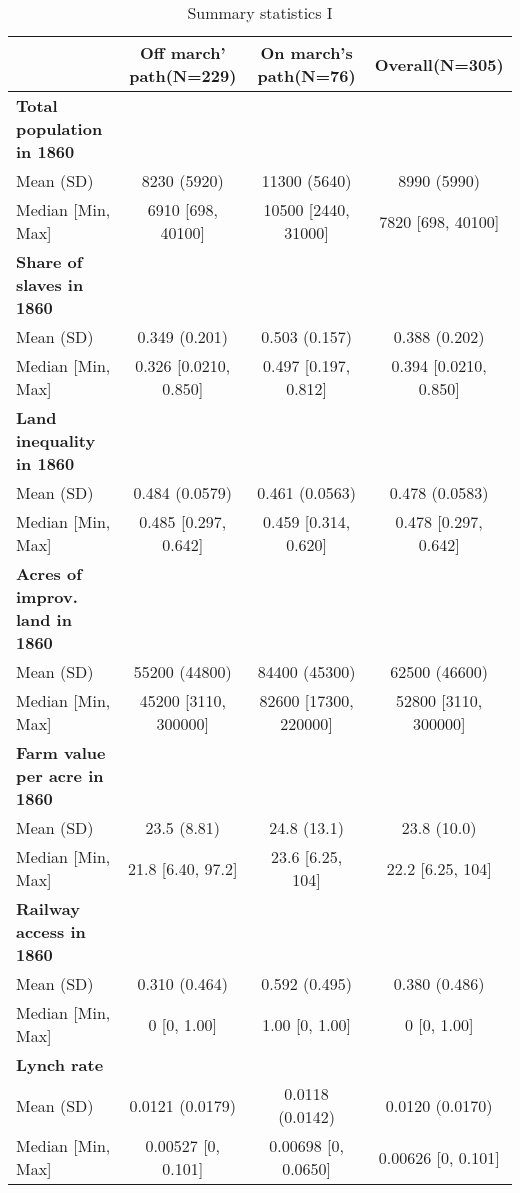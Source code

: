 \begin{table}[h]

\caption{\label{tab:desc_stat}Summary statistics I}
\centering
\fontsize{8}{10}\selectfont
\begin{tabular}[t]{>{}lccc}
\toprule
 & Off march' path(N=229) & On march's path(N=76) & Overall(N=305)\\
\midrule
\textbf{Total population in 1860} &  &  & \\
Mean (SD) & 8230 (5920) & 11300 (5640) & 8990 (5990)\\
Median [Min, Max] & 6910 [698, 40100] & 10500 [2440, 31000] & 7820 [698, 40100]\\
\addlinespace
\textbf{Share of slaves in 1860} &  &  & \\
Mean (SD) & 0.349 (0.201) & 0.503 (0.157) & 0.388 (0.202)\\
Median [Min, Max] & 0.326 [0.0210, 0.850] & 0.497 [0.197, 0.812] & 0.394 [0.0210, 0.850]\\
\addlinespace
\textbf{Land inequality in 1860} &  &  & \\
Mean (SD) & 0.484 (0.0579) & 0.461 (0.0563) & 0.478 (0.0583)\\
Median [Min, Max] & 0.485 [0.297, 0.642] & 0.459 [0.314, 0.620] & 0.478 [0.297, 0.642]\\
\addlinespace
\textbf{Acres of improv. land in 1860} &  &  & \\
Mean (SD) & 55200 (44800) & 84400 (45300) & 62500 (46600)\\
Median [Min, Max] & 45200 [3110, 300000] & 82600 [17300, 220000] & 52800 [3110, 300000]\\
\addlinespace
\textbf{Farm value per acre in 1860} &  &  & \\
Mean (SD) & 23.5 (8.81) & 24.8 (13.1) & 23.8 (10.0)\\
Median [Min, Max] & 21.8 [6.40, 97.2] & 23.6 [6.25, 104] & 22.2 [6.25, 104]\\
\addlinespace
\textbf{Railway access in 1860} &  &  & \\
Mean (SD) & 0.310 (0.464) & 0.592 (0.495) & 0.380 (0.486)\\
Median [Min, Max] & 0 [0, 1.00] & 1.00 [0, 1.00] & 0 [0, 1.00]\\
\addlinespace
\textbf{Lynch rate} &  &  & \\
Mean (SD) & 0.0121 (0.0179) & 0.0118 (0.0142) & 0.0120 (0.0170)\\
Median [Min, Max] & 0.00527 [0, 0.101] & 0.00698 [0, 0.0650] & 0.00626 [0, 0.101]\\

\end{tabular}
\end{table}
